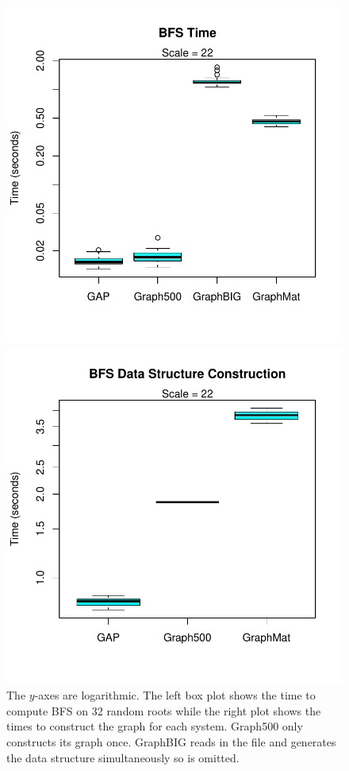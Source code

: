 \documentclass{llncs}
\begin{document}
\begin{figure}
	\centering
	\begin{minipage}{0.48\linewidth}
		\includegraphics[width=\linewidth, trim=0 36pt 18pt 0, clip]{graphics/bfs_time.pdf}
	\end{minipage}
	\begin{minipage}{0.48\linewidth}
		\includegraphics[width=\linewidth, trim=0 36pt 18pt 0, clip]{graphics/bfs_dsc.pdf}
	\end{minipage}
	\caption{The $y$-axes are logarithmic. The left box plot shows the time to compute BFS on 32 random roots while the right plot shows the times to construct the graph for each system. Graph500 only constructs its graph once. GraphBIG reads in the file and generates the data structure simultaneously so is omitted.}
	\label{fig:bfs-time}
\end{figure}
\end{document}
